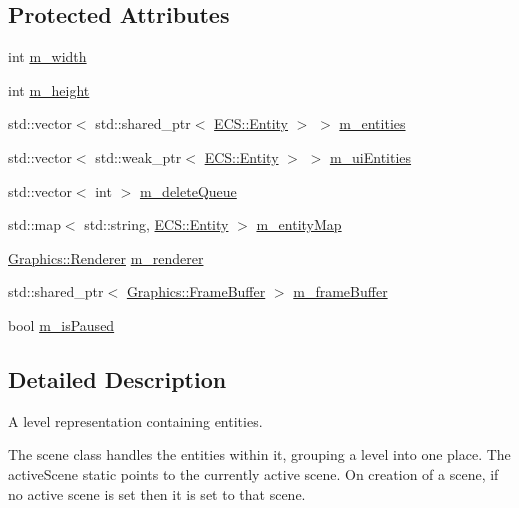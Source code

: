 \subsection*{Protected Attributes}
\begin{DoxyCompactItemize}
\item 
int \hyperlink{class_cookie_eng_1_1_scene_1_1_scene_a1990da3f0d067d2b542aa6b8fc6f0d43}{m\+\_\+width}
\item 
int \hyperlink{class_cookie_eng_1_1_scene_1_1_scene_aea87f5d089b50a248e01ae281441edd3}{m\+\_\+height}
\item 
std\+::vector$<$ std\+::shared\+\_\+ptr$<$ \hyperlink{class_cookie_eng_1_1_e_c_s_1_1_entity}{E\+C\+S\+::\+Entity} $>$ $>$ \hyperlink{class_cookie_eng_1_1_scene_1_1_scene_ad27cdfdb082498a7b812e054d4b28cb9}{m\+\_\+entities}
\item 
std\+::vector$<$ std\+::weak\+\_\+ptr$<$ \hyperlink{class_cookie_eng_1_1_e_c_s_1_1_entity}{E\+C\+S\+::\+Entity} $>$ $>$ \hyperlink{class_cookie_eng_1_1_scene_1_1_scene_a8f1b8723deba48f2d685008cbf1f14a2}{m\+\_\+ui\+Entities}
\item 
std\+::vector$<$ int $>$ \hyperlink{class_cookie_eng_1_1_scene_1_1_scene_a57af2369c4079df376fa6137b6249eaf}{m\+\_\+delete\+Queue}
\item 
std\+::map$<$ std\+::string, \hyperlink{class_cookie_eng_1_1_e_c_s_1_1_entity}{E\+C\+S\+::\+Entity} $>$ \hyperlink{class_cookie_eng_1_1_scene_1_1_scene_a3ded68c1652ffebf8a4827c6313ccae0}{m\+\_\+entity\+Map}
\item 
\hyperlink{class_cookie_eng_1_1_graphics_1_1_renderer}{Graphics\+::\+Renderer} \hyperlink{class_cookie_eng_1_1_scene_1_1_scene_aff47a056f32060d1180ae9bd379e9578}{m\+\_\+renderer}
\item 
std\+::shared\+\_\+ptr$<$ \hyperlink{class_cookie_eng_1_1_graphics_1_1_frame_buffer}{Graphics\+::\+Frame\+Buffer} $>$ \hyperlink{class_cookie_eng_1_1_scene_1_1_scene_a44b75b86a2f7ae2ce4dc05c20255e29e}{m\+\_\+frame\+Buffer}
\item 
bool \hyperlink{class_cookie_eng_1_1_scene_1_1_scene_a55c454b1a9914d610be2485027f14f31}{m\+\_\+is\+Paused}
\end{DoxyCompactItemize}


\subsection{Detailed Description}
A level representation containing entities. 

The scene class handles the entities within it, grouping a level into one place. The active\+Scene static points to the currently active scene. On creation of a scene, if no active scene is set then it is set to that scene. 

